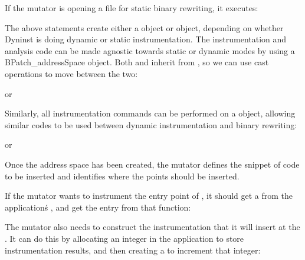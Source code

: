 
If the mutator is opening a file for static binary rewriting, it executes:


The above statements create either a  object or  object, depending on whether Dyninst
is doing dynamic or static instrumentation. The instrumentation and analysis code can be made agnostic towards static
or dynamic modes by using a BPatch_addressSpace object. Both  and  inherit from
, so we can use cast operations to move between the two:


or


Similarly, all instrumentation commands can be performed on a  object, allowing similar codes to be
used between dynamic instrumentation and binary rewriting:


or


Once the address space has been created, the mutator defines the snippet of code to be inserted and identifies where the
points should be inserted.

If the mutator wants to instrument the entry point of , it should get a
 from the application\'s , and get the entry 
 from that function:


The mutator also needs to construct the instrumentation that it will insert at the .
It can do this by allocating an integer in the application to store instrumentation results, and
then creating a  to increment that integer:

